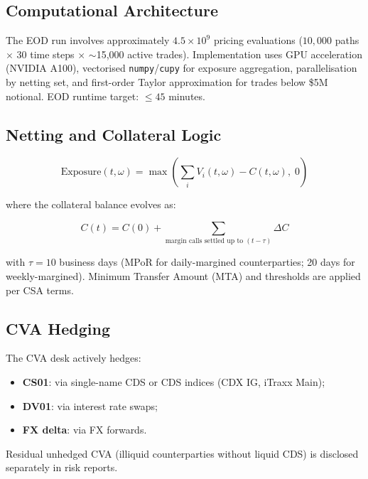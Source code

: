 \documentclass[11pt,a4paper]{article}
\begin{document}
\subsection{Computational Architecture}

The EOD run involves approximately $4.5 \times 10^9$ pricing evaluations
($10{,}000$ paths $\times$ 30 time steps $\times$ $\sim$15,000 active trades).
Implementation uses GPU acceleration (NVIDIA A100), vectorised
\texttt{numpy}/\texttt{cupy} for exposure aggregation, parallelisation by
netting set, and first-order Taylor approximation for trades below \$5M
notional. EOD runtime target: $\leq 45$ minutes.

\subsection{Netting and Collateral Logic}

\begin{equation}
  \text{Exposure}(t, \omega) = \max\!\left(\sum_i V_i(t, \omega) - C(t, \omega),\; 0\right)
  \label{eq:exposure}
\end{equation}

where the collateral balance evolves as:

\begin{equation}
  C(t) = C(0) + \sum_{\text{margin calls settled up to }(t - \tau)} \Delta C
  \label{eq:collateral}
\end{equation}

with $\tau = 10$ business days (MPoR for daily-margined counterparties;
20 days for weekly-margined). Minimum Transfer Amount (MTA) and thresholds
are applied per CSA terms.

\subsection{CVA Hedging}

The CVA desk actively hedges:
\begin{itemize}[noitemsep]
  \item \textbf{CS01}: via single-name CDS or CDS indices (CDX IG, iTraxx
        Main);
  \item \textbf{DV01}: via interest rate swaps;
  \item \textbf{FX delta}: via FX forwards.
\end{itemize}

Residual unhedged CVA (illiquid counterparties without liquid CDS) is
disclosed separately in risk reports.
\end{document}
